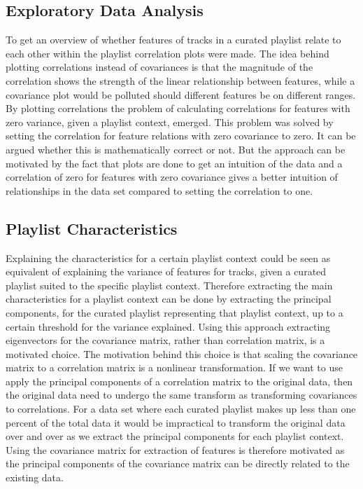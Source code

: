 \documentclass[a4paper,11pt]{kth-mag}
\begin{document}
\subsection{Exploratory Data Analysis}
To get an overview of whether features of tracks in a curated playlist relate to each other within the playlist correlation plots were made. The idea behind plotting correlations instead of covariances is that the magnitude of the correlation shows the strength of the linear relationship between features, while a covariance plot would be polluted should different features be on different ranges. By plotting correlations the problem of calculating correlations for features with zero variance, given a playlist context, emerged. This problem was solved by setting the correlation for feature relations with zero covariance to zero. It can be argued whether this is mathematically correct or not. But the approach can be motivated by the fact that plots are done to get an intuition of the data and a correlation of zero for features with zero covariance gives a better intuition of relationships in the data set compared to setting the correlation to one.

\subsection{Playlist Characteristics}
Explaining the characteristics for a certain playlist context could be seen as equivalent of explaining the variance of features for tracks, given a curated playlist suited to the specific playlist context. Therefore extracting the main characteristics for a playlist context can be done by extracting the principal components, for the curated playlist representing that playlist context, up to a certain threshold for the variance explained. Using this approach extracting eigenvectors for the covariance matrix, rather than correlation matrix, is a motivated choice. The motivation behind this choice is that scaling the covariance matrix to a correlation matrix is a nonlinear transformation. If we want to use apply the principal components of a correlation matrix to the original data, then the original data need to undergo the same transform as transforming covariances to correlations. For a data set where each curated playlist makes up less than one percent of the total data it would be impractical to transform the original data over and over as we extract the principal components for each playlist context. Using the covariance matrix for extraction of features is therefore motivated as the principal components of the covariance matrix can be directly related to the existing data.
\end{document}
